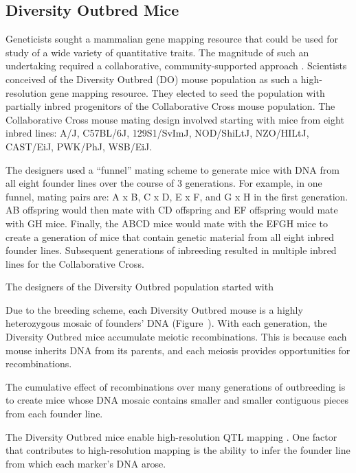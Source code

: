 \documentclass[]{article}
\begin{document}
\subsection{Diversity Outbred Mice}

Geneticists sought a mammalian gene mapping resource 
that could be used for study of a wide variety of quantitative traits. 
The magnitude of such an undertaking required a collaborative, community-supported approach \citep{de2014genetics}. Scientists conceived of the Diversity Outbred (DO) mouse population as such a high-resolution gene mapping resource. They elected to seed the population with partially inbred progenitors of the Collaborative Cross mouse population. The Collaborative Cross mouse mating design involved starting with mice from eight inbred lines: A/J, C57BL/6J, 129S1/SvImJ, NOD/ShiLtJ, NZO/HILtJ, CAST/EiJ, PWK/PhJ, WSB/EiJ.

The designers used a ``funnel'' mating scheme to generate mice with DNA from all eight founder lines over the course of 3 generations. For example, in one funnel, mating pairs are: A x B, C x D, E x F, and G x H in the first generation. AB offspring would then mate with CD offspring and EF offspring would mate with GH mice. Finally, the ABCD mice would mate with the EFGH mice to create a generation of mice that contain genetic material from all eight inbred founder lines. Subsequent generations of inbreeding resulted in multiple inbred lines for the Collaborative Cross. 

The designers of the Diversity Outbred population started with 

Due to the breeding scheme, each Diversity Outbred mouse is a highly heterozygous mosaic of 
founders' DNA (Figure~). 
With each generation, the Diversity Outbred mice accumulate meiotic recombinations. 
This is because each mouse inherits DNA from its parents, and each meiosis provides opportunities for recombinations. 

The cumulative effect of recombinations over many generations of outbreeding is to create mice whose DNA mosaic contains smaller and smaller contiguous pieces from each founder line. 

The Diversity Outbred mice enable high-resolution QTL mapping \citep{gatti2014quantitative}. One factor that contributes to high-resolution mapping is the ability to infer the founder line from which each marker's DNA arose. 
\end{document}
